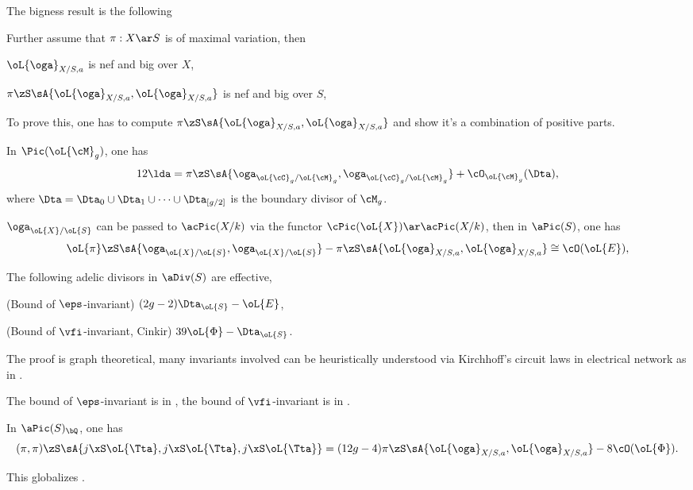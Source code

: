 \documentclass[a4paper, twoside]{article}
\begin{document}
The bigness result is the following
\begin{thm}
	Further assume that $\pi:X\ar S$ is of maximal variation, then
	\begin{enr}
		\item $\oL{\oga}_{X/S,a}$ is nef and big over $X$,
		\item $\pi\zS\sA{\oL{\oga}_{X/S,a},\oL{\oga}_{X/S,a}}$ is nef and big over $S$,
	\end{enr}
\end{thm}


To prove this, one has to compute $\pi\zS\sA{\oL{\oga}_{X/S,a},\oL{\oga}_{X/S,a}}$ and show it's a combination of positive parts.

\begin{enr}
	\item {}
	\begin{thm}
		In $\Pic(\oL{\cM}_{g})$, one has
		\[
			12\lda=\pi\zS\sA{\oga_{\oL{\cC}_{g}/\oL{\cM}_{g}},\oga_{\oL{\cC}_{g}/\oL{\cM}_{g}}}+\cO_{\oL{\cM}_{g}}(\Dta),
		\]
		where $\Dta=\Dta_{0}\cup\Dta_{1}\cup\cdots\cup\Dta_{[g/2]}$ is the boundary divisor of $\cM_{g}$.
	\end{thm}
	\item {}
	\begin{thm}
		$\oga_{\oL{X}/\oL{S}}$ can be passed to $\acPic(X/k)$ via the functor $\cPic(\oL{X})\ar\acPic(X/k)$, then in $\aPic(S)$, one has
		\[
			\oL{\pi}\zS\sA{\oga_{\oL{X}/\oL{S}},\oga_{\oL{X}/\oL{S}}}-\pi\zS\sA{\oL{\oga}_{X/S,a},\oL{\oga}_{X/S,a}}\cong\cO(\oL{E}),
		\]
	\end{thm}
	\item {}
	\begin{lem}
		The following adelic divisors in $\aDiv(S)$ are effective,
		\begin{enr}
			\item (Bound of $\eps$-invariant) $(2g-2)\Dta_{\oL{S}}-\oL{E}$,
			\item (Bound of $\vfi$-invariant, Cinkir) $39\oL{\Phi}-\Dta_{\oL{S}}$.
		\end{enr}
	\end{lem}

	\begin{rmk}
		The proof is graph theoretical, many invariants involved can be heuristically understood via Kirchhoff's circuit laws in electrical network as in \cite{BF2006}.

		The bound of $\eps$-invariant is in \cite{BF2006}, the bound of $\vfi$-invariant is in \cite[Theorem~2.11]{Cinkir2011}.
	\end{rmk}
	\item {}
	\begin{thm}[Theorem~3.5]
		In $\aPic(S)_{\bQ}$, one has
		\[
			(\pi,\pi)\zS\sA{j\xS\oL{\Tta},j\xS\oL{\Tta},j\xS\oL{\Tta}}=(12g-4)\pi\zS\sA{\oL{\oga}_{X/S,a},\oL{\oga}_{X/S,a}}-8\cO(\oL{\Phi}).
		\]
	\end{thm}
	\begin{rmk}
		This globalizes \cite[Theorem~8.1]{deJong2018}.
	\end{rmk}
\end{enr}
\end{document}
